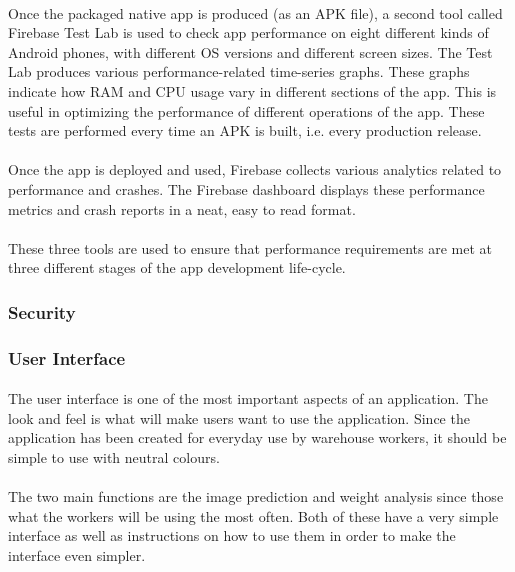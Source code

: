 \documentclass[a4paper, 11pt]{article}
\begin{document}
            \paragraph{}
            Once the packaged native app is produced (as an APK file), a second tool called Firebase Test Lab is used to check app performance on eight different kinds of Android phones, with different OS versions and different screen sizes. The Test Lab produces various performance-related time-series graphs. These graphs indicate how RAM and CPU usage vary in different sections of the app. This is useful in optimizing the performance of different operations of the app. These tests are performed every time an APK is built, i.e. every production release.
            \paragraph{}
            Once the app is deployed and used, Firebase collects various analytics related to performance and crashes. The Firebase dashboard displays these performance metrics and crash reports in a neat, easy to read format.
            \paragraph{}
            These three tools are used to ensure that performance requirements are met at three different stages of the app development life-cycle.
        
        \subsubsection{Security}
        
        \subsubsection{User Interface}
            \paragraph{}
            The user interface is one of the most important aspects of an application. The look and feel is what will make users want to use the application. Since the application has been created for everyday use by warehouse workers, it should be simple to use with neutral colours.
            \paragraph{}
            The two main functions are the image prediction and weight analysis since those what the workers will be using the most often. Both of these have a very simple interface as well as instructions on how to use them in order to make the interface even simpler.
\end{document}
